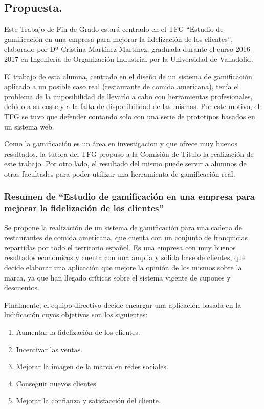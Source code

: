 \documentclass[twoside]{report}
\begin{document}
\subsection{Propuesta.}
Este Trabajo de Fin de Grado estará centrado en el TFG “Estudio de gamificación en una empresa para mejorar la fidelización de los clientes”, elaborado por Dª Cristina Martínez Martínez, graduada durante el curso 2016-2017 en Ingeniería de Organización Industrial por la Universidad de Valladolid.  

El trabajo de esta alumna, centrado en el diseño de un sistema de gamificación aplicado a un posible caso real (restaurante de comida americana), tenía el problema de la imposibilidad de llevarlo a cabo con herramientas profesionales, debido a su coste y a la falta de disponibilidad de las mismas. Por este motivo, el TFG se tuvo que defender contando solo con una serie de prototipos basados en un sistema web. 

Como la gamificación es un área en investigacion y que ofrece muy buenos resultados, la tutora del TFG propuso a la Comisión de Título la realización de este trabajo. Por otro lado, el resultado del mismo puede servir a alumnos de otras facultades para poder utilizar una herramienta de gamificación real.
\subsubsection{Resumen de “Estudio de gamificación en una empresa para mejorar la fidelización de los clientes”}
Se propone la realización de un sistema de gamificación para una cadena de restaurantes de comida americana, que cuenta con un conjunto de franquicias repartidas por todo el territorio español. Es una empresa con muy buenos resultados económicos y cuenta con una amplia y sólida base de clientes, que decide elaborar una aplicación que mejore la opinión de los mismos sobre la marca, ya que han llegado críticas sobre el sistema vigente de cupones y descuentos.

Finalmente, el equipo directivo decide encargar una aplicación basada en la ludificación cuyos objetivos son los siguientes:

\begin{enumerate}
\item Aumentar la fidelización de los clientes.
\item Incentivar las ventas.
\item Mejorar la imagen de la marca en redes sociales.
\item Conseguir nuevos clientes.
\item Mejorar la confianza y satisfacción del cliente. 
\end{enumerate}
\end{document}
